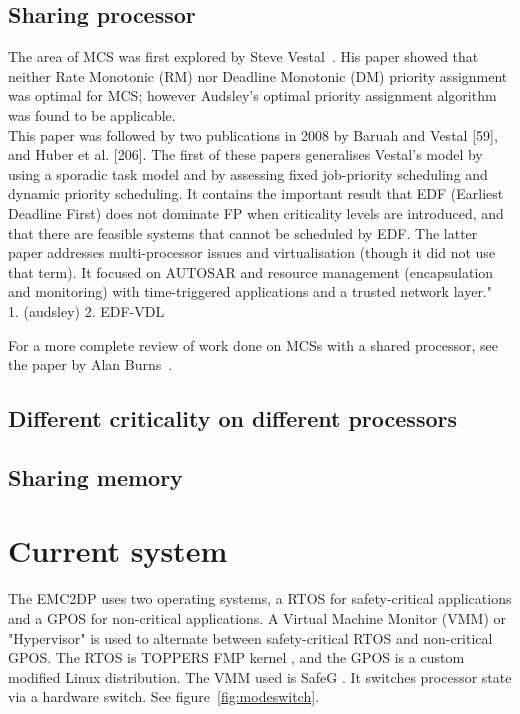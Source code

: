 \subsection{Sharing processor}
The area of MCS was first explored by Steve Vestal~\cite{vestal2007}. His paper showed that neither Rate Monotonic (RM) nor Deadline Monotonic (DM) priority assignment was optimal for MCS; however Audsley’s optimal priority assignment algorithm \cite{audsley2001} was found to be applicable. \\ %

This paper was followed by two publications in 2008 by Baruah and Vestal [59], and Huber et al. [206]. The first of these papers generalises Vestal’s model by using a sporadic task model and by assessing fixed job-priority scheduling and dynamic priority scheduling. It contains the important result that EDF (Earliest Deadline First) does not dominate FP when criticality levels are introduced, and that there are feasible systems that cannot be scheduled by EDF. The latter paper addresses multi-processor issues and virtualisation (though it did not use that term). It focused on AUTOSAR and resource management (encapsulation and monitoring) with time-triggered applications and a trusted network layer." \\

1. (audsley) 2. EDF-VDL

For a more complete review of work done on MCSs with a shared processor, see the paper by Alan Burns~\cite{burns2016}.

\subsection{Different criticality on different processors}


\subsection{Sharing memory}

\section{Current system}
\label{sec:lit_emc2mcs}
The EMC2DP uses two operating systems, a RTOS for safety-critical applications and a GPOS for non-critical applications. A Virtual Machine Monitor (VMM) or "Hypervisor" is used to alternate between safety-critical RTOS and non-critical GPOS. The RTOS is TOPPERS FMP kernel \cite{website:FMP}, and the GPOS is a custom modified Linux distribution. The VMM used is SafeG \cite{website:safeg}. It switches processor state via a hardware switch. See figure~\ref{fig:modeswitch}.

